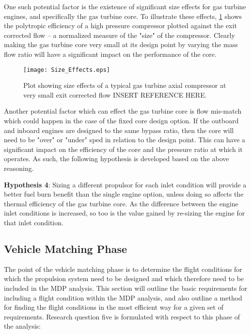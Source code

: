 				One such potential factor is the existence of significant size effects for gas turbine engines, and specifically the gas turbine core.  To illustrate these effects, \ref{Size_Effects} shows the polytropic efficiency of a high pressure compressor plotted against the exit corrected flow -- a normalized measure of the "size" of the compressor.  Clearly making the gas turbine core very small at its design point by varying the mass flow ratio will have a significant impact on the performance of the core. 
				
				\begin{figure}[htp]
					\centering
					\texttt{[image: Size\_Effects.eps]}
					\caption{Plot showing size effects of a typical gas turbine axial compressor at very small exit corrected flow INSERT REFERENCE HERE.}
					\label{Size_Effects}
				\end{figure}				
				
				Another potential factor which can effect the gas turbine core is flow mis-match which could happen in the case of the fixed core design option.  If the outboard and inboard engines are designed to the same bypass ratio, then the core will need to be "over" or "under" sped in relation to the design point.  This can have a significant impact on the efficiency of the core and the pressure ratio at which it operates.  As such, the following hypothesis is developed based on the above reasoning.  
				
				\noindent\makebox[\linewidth]{\rule{\textwidth}{3pt}}								
				\textbf{Hypothesis 4}:  Sizing a different propulsor for each inlet condition will provide a better fuel burn benefit than the single engine option, unless doing so affects the thermal efficiency of the gas turbine core. As the difference between the engine inlet conditions is increased, so too is the value gained by re-sizing the engine for that inlet condition.
				\noindent\makebox[\linewidth]{\rule{\textwidth}{3pt}}				
					
	\subsection{Vehicle Matching Phase}
		The point of the vehicle matching phase is to determine the flight conditions for which the propulsion system need to be designed and which therefore need to be included in the MDP analysis.  This section will outline the basic requirements for including a flight condition within the MDP analysis, and also outline a method for finding the flight conditions in the most efficient way for a given set of requirements.  Research question five is formulated with respect to this phase of the analysis:


